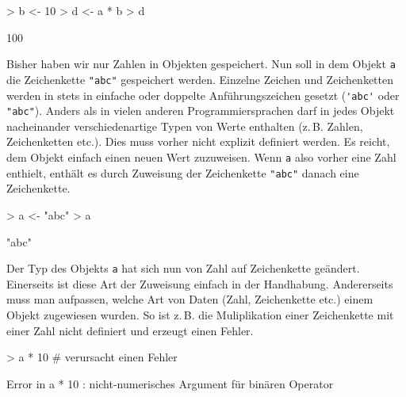 \begin{Schunk}
\begin{Sinput}
> b <- 10
> d <- a * b
> d
\end{Sinput}
\begin{Soutput}
[1] 100
\end{Soutput}
\end{Schunk}

Bisher haben wir nur Zahlen in Objekten gespeichert. Nun soll in dem Objekt \verb!a! die Zeichenkette \verb!"abc"! gespeichert werden. Einzelne Zeichen und Zeichenketten werden in \R{} stets in einfache oder doppelte Anführungszeichen gesetzt (\verb!'abc'! oder \verb!"abc"!). Anders als in vielen anderen Programmiersprachen darf in \R{} jedes Objekt nacheinander verschiedenartige Typen von Werte enthalten (z.\,B. Zahlen, Zeichenketten etc.). Dies muss vorher nicht explizit definiert werden. Es reicht, dem Objekt einfach einen neuen Wert zuzuweisen. Wenn \verb!a! also vorher eine Zahl enthielt, enthält es durch Zuweisung der Zeichenkette \verb!"abc"! danach eine Zeichenkette. 

\begin{Schunk}
\begin{Sinput}
> a <- "abc"  
> a
\end{Sinput}
\begin{Soutput}
[1] "abc"
\end{Soutput}
\end{Schunk}

Der Typ des Objekts \verb!a! hat sich nun von Zahl auf Zeichenkette geändert. Einerseits ist diese Art der Zuweisung einfach in der Handhabung. Andererseits muss man aufpassen, welche Art von Daten  (Zahl, Zeichenkette etc.) einem Objekt zugewiesen wurden. So ist z.\,B. die Muliplikation einer Zeichenkette mit einer Zahl nicht definiert und erzeugt einen Fehler.

\begin{Schunk}
\begin{Sinput}
> a * 10        # verursacht einen Fehler
\end{Sinput}
\end{Schunk}
\vspace{-8mm}

\begin{Schunk}
\begin{Soutput}
Error in a * 10 : nicht-numerisches Argument für binären Operator
\end{Soutput}
\end{Schunk}

